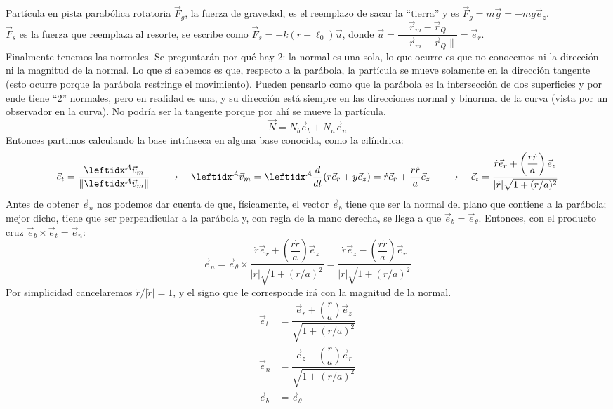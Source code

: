 \begin{solucion}{Partícula en pista parabólica rotatoria}
$\vec{F}_g$, la fuerza de gravedad, es el reemplazo de sacar la ``tierra'' y es $\vec{F}_g=m\vec{g}=-mg\vec{e}_z$.\\
$\vec{F}_s$ es la fuerza que reemplaza al resorte, se escribe como $\vec{F}_s=-k(r-\ell_0)\vec{u}$, donde $\vec{u}=\dfrac{\vec{r}_m-\vec{r}_Q}{\|\vec{r}_m-\vec{r}_Q\|}=\vec{e}_r$.\\
Finalmente tenemos las normales. Se preguntarán por qué hay 2: la normal es una sola, lo que ocurre es que no conocemos ni la dirección ni la magnitud de la normal. Lo que sí sabemos es que, respecto a la parábola, la partícula se mueve solamente en la dirección tangente (esto ocurre porque la parábola restringe el movimiento). Pueden pensarlo como que la parábola es la intersección de dos superficies y por ende tiene ``2'' normales, pero en realidad es una, y su dirección está siempre en las direcciones normal y binormal de la curva (vista por un observador en la curva). No podría ser la tangente porque por ahí se mueve la partícula.
$$\vec{N}=N_b\vec{e}_b+N_n\vec{e}_n$$
Entonces partimos calculando la base intrínseca en alguna base conocida, como la cilíndrica:
$$\vec{e}_t=\dfrac{\marc{\vec{v}_m}{A}}{\|\marc{\vec{v}_m}{A}\|}\quad\longrightarrow\quad\marc{\vec{v}_m}{A}=\der{(r\vec{e}_r+y\vec{e}_z)}{A}{}=\dot r\vec{e}_r+ \dfrac{r\dot r}{a} \vec{e}_z\quad\longrightarrow\quad\vec{e}_t=\dfrac{\dot r\vec{e}_r+\left(\dfrac{r\dot r}{a}\right)\vec{e}_z}{|\dot r|\sqrt{1+(r/a)^2}}$$
Antes de obtener $\vec{e}_n$ nos podemos dar cuenta de que, físicamente, el vector $\vec{e}_b$ tiene que ser la normal del plano que contiene a la parábola; mejor dicho, tiene que ser perpendicular a la parábola y, con regla de la mano derecha, se llega a que $\vec{e}_b=\vec{e}_\theta$. Entonces, con el producto cruz $\vec{e}_b\times\vec{e}_t=\vec{e}_n$:
$$\vec{e}_n=\vec{e}_\theta\times\dfrac{\dot r\vec{e}_r+\left(\dfrac{r\dot r}{a}\right)\vec{e}_z}{|\dot r|\sqrt{1+(r/a)^2}}=\dfrac{\dot r\vec{e}_z-\left(\dfrac{r\dot r}{a}\right)\vec{e}_r}{|\dot r|\sqrt{1+(r/a)^2}}$$
Por simplicidad cancelaremos $\dot r/|\dot r|=1$, y el signo que le corresponde irá con la magnitud de la normal.
\begin{equation*}
\begin{split}
    \vec{e}_t&=\dfrac{\vec{e}_r+\left(\dfrac{r}{a}\right)\vec{e}_z}{\sqrt{1+(r/a)^2}}\\
    \vec{e}_n&=\dfrac{\vec{e}_z-\left(\dfrac{r}{a}\right)\vec{e}_r}{\sqrt{1+(r/a)^2}}\\
    \vec{e}_b&=\vec{e}_\theta
\end{split}
\end{equation*}


\end{solucion}
